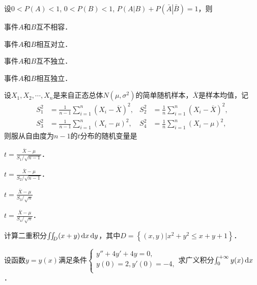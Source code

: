 \documentclass[plain,noanswer,medmath]{../../template/jnuexam}
\begin{document}
\begin{problem}
设$0 < P(A) < 1$, $0 < P(B) < 1$, $P(\left. A \right|B) + P(\left. \bar A \right|\bar B) = 1$，则\pickout{}
\begin{abcd}
\item 事件$A$和$B$互不相容．          
\item 事件$A$和$B$相互对立．
\item 事件$A$和$B$互不独立．          
\item 事件$A$和$B$相互独立．
\end{abcd}
\end{problem}


\begin{problem}
设$X_1,X_2, \cdots ,X_n$是来自正态总体$N(\mu ,\sigma^2)$的简单随机样本，$\overline{X}$是样本均值，记
\begin{align*}
  S_1^2&= \frac{1}{n - 1}\sum_{i = 1}^n (X_i - \overline{X})^2, &
  S_2^2&= \frac{1}{n}\sum_{i = 1}^n (X_i - \overline{X})^2, \\
  S_3^2&= \frac{1}{n - 1}\sum_{i = 1}^n (X_i - \mu)^2, &
  S_4^2&= \frac{1}{n}\sum_{i = 1}^n (X_i - \mu)^2,
\end{align*}
则服从自由度为$n - 1$的$t$分布的随机变量是\pickout{}
\begin{abcd}
\item $t = \frac{\overline{X}- \mu}{S_1/\sqrt{n - 1}}$．					
\item $t = \frac{\overline{X}- \mu}{S_2/\sqrt{n - 1}}$．
\item $t = \frac{\overline{X}- \mu}{S_3/\sqrt{n}}$							
\item $t = \frac{\overline{X}- \mu}{S_4/\sqrt{n}}$．
\end{abcd}
\end{problem}



\begin{problem}
计算二重积分$\iint_D (x + y)\mathop{}\!\mathrm{d} x\mathop{}\!\mathrm{d} y$，其中$D = \left\{\left. (x,y) \right| x^2 + y^2 \le x + y + 1 \right\}$．
\end{problem}



\begin{problem}
设函数$y = y(x)$满足条件$\begin{cases}
 y'' + 4y' + 4y = 0, \\
 y(0) = 2,y'(0) = - 4, \\
\end{cases}$求广义积分$\int_0^{+\infty} y(x)\mathop{}\!\mathrm{d} x$．
\end{problem}
\end{document}
